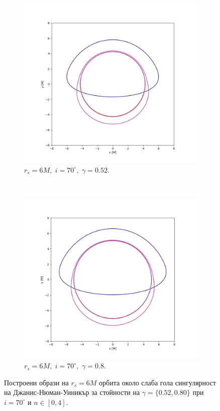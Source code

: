 \begin{figure}[!htb]
	\begin{subfigure}{6cm}
		\includegraphics[scale = 0.3]{JNW_70_deg_r6_gamma_0.52.png}
		\caption{$r_s = 6M,\,\, i = 70^\circ,\,\,\gamma = 0.52$.} 
	\end{subfigure}\,\,\,
	\begin{subfigure}{6cm}
		\includegraphics[scale = 0.3]{JNW_70_deg_r6_gamma_0.8.png}
		\caption{$r_s = 6M,\,\, i = 70^\circ,\,\,\gamma = 0.8$.}
	\end{subfigure}
	\caption[Построени образи на $r_s = 6M$ орбита около слаба гола сингулярност на Джанис-Нюман-Уиникър за различни стойности на $\gamma$ при $i = 70^\circ$.]{\small Построени образи на $r_s = 6M$ орбита около слаба гола сингулярност на Джанис-Нюман-Уиникър за стойности на $\gamma = \{0.52, 0.80\}$ при $i = 70^\circ$ и $n\in[0,4]$.} 
	\label{JNW_r6_70_deg}
\end{figure}

